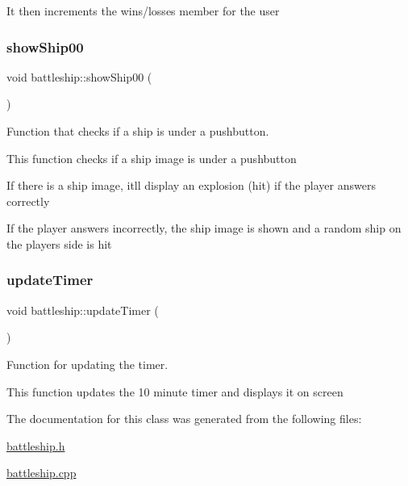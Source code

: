 It then increments the wins/losses member for the user \mbox{\label{classbattleship_afd1d4e449ff0b266871eca956b406b2b}} 
\subsubsection{\texorpdfstring{show\+Ship00}{showShip00}}
{\footnotesize\ttfamily void battleship\+::show\+Ship00 (\begin{DoxyParamCaption}{ }\end{DoxyParamCaption})\hspace{0.3cm}{\ttfamily [slot]}}



Function that checks if a ship is under a pushbutton. 

This function checks if a ship image is under a pushbutton

If there is a ship image, it\textquotesingle{}ll display an explosion (hit) if the player answers correctly

If the player answers incorrectly, the ship image is shown and a random ship on the player\textquotesingle{}s side is hit \mbox{\label{classbattleship_ad6e6acff47dd594732ad1606b62a9dbc}} 
\subsubsection{\texorpdfstring{update\+Timer}{updateTimer}}
{\footnotesize\ttfamily void battleship\+::update\+Timer (\begin{DoxyParamCaption}{ }\end{DoxyParamCaption})\hspace{0.3cm}{\ttfamily [slot]}}



Function for updating the timer. 

This function updates the 10 minute timer and displays it on screen 

The documentation for this class was generated from the following files\+:\begin{DoxyCompactItemize}
\item 
\hyperlink{battleship_8h}{battleship.\+h}\item 
\hyperlink{battleship_8cpp}{battleship.\+cpp}\end{DoxyCompactItemize}
